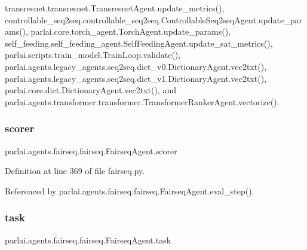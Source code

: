 transresnet.\+transresnet.\+Transresnet\+Agent.\+update\+\_\+metrics(), controllable\+\_\+seq2seq.\+controllable\+\_\+seq2seq.\+Controllable\+Seq2seq\+Agent.\+update\+\_\+params(), parlai.\+core.\+torch\+\_\+agent.\+Torch\+Agent.\+update\+\_\+params(), self\+\_\+feeding.\+self\+\_\+feeding\+\_\+agent.\+Self\+Feeding\+Agent.\+update\+\_\+sat\+\_\+metrics(), parlai.\+scripts.\+train\+\_\+model.\+Train\+Loop.\+validate(), parlai.\+agents.\+legacy\+\_\+agents.\+seq2seq.\+dict\+\_\+v0.\+Dictionary\+Agent.\+vec2txt(), parlai.\+agents.\+legacy\+\_\+agents.\+seq2seq.\+dict\+\_\+v1.\+Dictionary\+Agent.\+vec2txt(), parlai.\+core.\+dict.\+Dictionary\+Agent.\+vec2txt(), and parlai.\+agents.\+transformer.\+transformer.\+Transformer\+Ranker\+Agent.\+vectorize().

\mbox{\label{classparlai_1_1agents_1_1fairseq_1_1fairseq_1_1FairseqAgent_a677c5d13f46909154b93529fa1dfc5bf}} 
\subsubsection{\texorpdfstring{scorer}{scorer}}
{\footnotesize\ttfamily parlai.\+agents.\+fairseq.\+fairseq.\+Fairseq\+Agent.\+scorer}



Definition at line 369 of file fairseq.\+py.



Referenced by parlai.\+agents.\+fairseq.\+fairseq.\+Fairseq\+Agent.\+eval\+\_\+step().

\mbox{\label{classparlai_1_1agents_1_1fairseq_1_1fairseq_1_1FairseqAgent_a40ba5a4ef148b203f84308703d497e35}} 
\subsubsection{\texorpdfstring{task}{task}}
{\footnotesize\ttfamily parlai.\+agents.\+fairseq.\+fairseq.\+Fairseq\+Agent.\+task}



